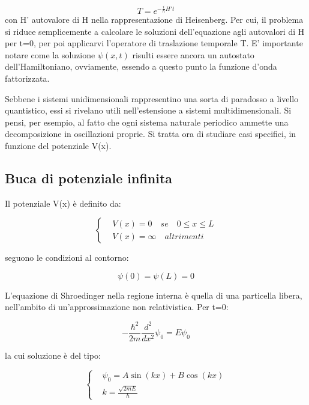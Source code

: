 \documentclass{article}
\begin{document}
\begin{equation}
    T=e^{-\frac{i}{\hbar}H't}
\end{equation}
con H' autovalore di H nella rappresentazione di Heisenberg.
Per cui, il problema si riduce semplicemente a calcolare le soluzioni dell'equazione agli autovalori di H per t=0, per poi applicarvi l'operatore di traslazione temporale T.
E' importante notare come la soluzione $\psi(x,t)$ risulti essere ancora un autostato dell'Hamiltoniano, ovviamente, essendo a questo punto la funzione d'onda fattorizzata.

Sebbene i sistemi unidimensionali rappresentino una sorta di paradosso a livello quantistico, essi si rivelano utili nell'estensione a sistemi multidimensionali.
Si pensi, per esempio, al fatto che ogni sistema naturale periodico ammette una decomposizione in oscillazioni proprie.
Si tratta ora di studiare casi specifici, in funzione del potenziale V(x).

\subsection{Buca di potenziale infinita}

Il potenziale V(x) è definito da:

\begin{equation}
    \left\{
    \begin{aligned}
         & V(x)=0 \quad se \quad 0\leq x\leq L \\
         & V(x)=\infty \quad altrimenti
    \end{aligned}
    \right.
\end{equation}

seguono le condizioni al contorno:

\begin{equation}
    \psi(0)=\psi(L)=0
\end{equation}

L'equazione di Shroedinger nella regione interna è quella di una particella libera, nell'ambito di un'approssimazione
non relativistica. Per t=0:

\begin{equation}
    -\frac{\hbar^2}{2m}\frac{d^2}{dx^2}\psi_0= E\psi_0
\end{equation}

la cui soluzione è del tipo:

\begin{equation}
    \left\{
    \begin{aligned}
         & \psi_0=A\sin(kx)+B\cos(kx) \\
         & k=\frac{\sqrt{2mE}}{\hbar}
    \end{aligned}
    \right.
\end{equation}
\end{document}
